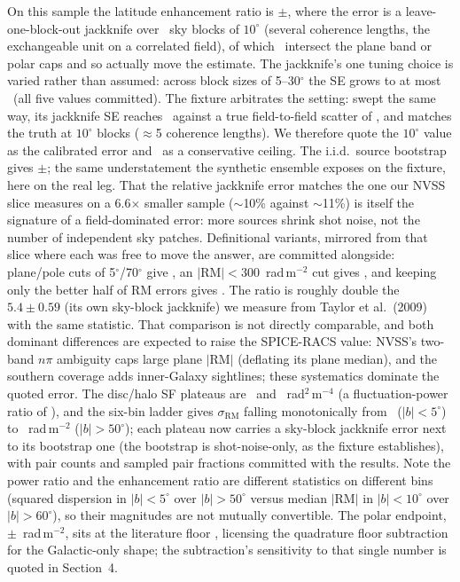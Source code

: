 \documentclass[twocolumn]{aastex631}
\begin{document}
On this sample the latitude enhancement ratio is \rmsRealRatio$\pm$\rmsRealRatioJkSe,
where the error is a leave-one-block-out jackknife over \rmsRealJkBlocks\ sky blocks of
$10^\circ$ (several coherence lengths, the exchangeable unit on a correlated field), of which
\rmsRealJkBlocksEff\ intersect the plane band or polar caps and so actually move the estimate.
The jackknife's one tuning choice is varied rather than assumed: across block sizes of
5--30$^\circ$ the SE grows to at most \rmsRealRatioJkSeMax\ (all five values committed). The
fixture arbitrates the setting: swept the same way, its jackknife SE reaches
\rmsSynRatioJkSeMax\ against a true field-to-field scatter of \rmsSynRatioEnsSd, and matches
the truth at $10^\circ$ blocks ($\approx$5 coherence lengths). We therefore quote the $10^\circ$
value as the calibrated error and \rmsRealRatioJkSeMax\ as a conservative ceiling. The
i.i.d.\ source bootstrap gives $\pm$\rmsRealRatioSe; the same understatement the synthetic
ensemble exposes on the fixture, here on the real leg. That the relative jackknife error
matches the one our NVSS slice measures on a 6.6$\times$ smaller sample ($\sim$10\% against
$\sim$11\%) is itself the signature of a field-dominated error: more sources shrink shot
noise, not the number of independent sky patches. Definitional variants, mirrored from that
slice where each was free to move the answer, are committed alongside: plane/pole cuts of
5$^\circ$/70$^\circ$ give \rmsRealRatioAltBins, an $|\mathrm{RM}|<300$~rad\,m$^{-2}$ cut gives
\rmsRealRatioCutThree, and keeping only the better half of RM errors gives \rmsRealRatioErmCut.
The ratio is roughly double the $5.4\pm0.59$ (its own sky-block jackknife) we measure from
Taylor et al.\ (2009) with the same statistic. That comparison is not directly
comparable, and both dominant differences are expected to raise the SPICE-RACS value: NVSS's
two-band $n\pi$ ambiguity caps large plane $|\mathrm{RM}|$ (deflating its plane median), and the
southern coverage adds inner-Galaxy sightlines; these systematics dominate the quoted error.
The disc/halo SF plateaus are \rmsRealPlatLo\ and \rmsRealPlatHi~rad$^2$\,m$^{-4}$ (a
fluctuation-power ratio of \rmsRealPlatRatio), and the
six-bin ladder gives $\sigma_\mathrm{RM}$ falling monotonically from \rmsRealSigPlane\
($|b|<5^\circ$) to \rmsRealSigPole~rad\,m$^{-2}$ ($|b|>50^\circ$); each plateau now carries a
sky-block jackknife error next to its bootstrap one (the bootstrap is shot-noise-only, as
the fixture establishes), with pair counts and sampled pair fractions committed
with the results. Note the power ratio and the enhancement ratio are different statistics on
different bins (squared dispersion in $|b|<5^\circ$ over $|b|>50^\circ$ versus median
$|$RM$|$ in $|b|<10^\circ$ over $|b|>60^\circ$), so their magnitudes are not mutually
convertible. The polar
endpoint, \rmsRealFloorSig$\pm$\rmsRealFloorSigJkErr~rad\,m$^{-2}$, sits at the literature floor
\citep{mao2010,taylor2009}, licensing the quadrature floor subtraction for the Galactic-only
shape; the subtraction's sensitivity to that single number is quoted in Section~4.
\end{document}
